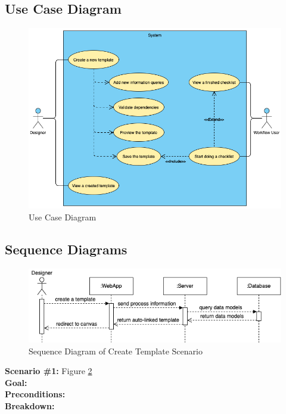 \subsection{Use Case Diagram}
\begin{figure}[ht!]
    \centering
    \includegraphics[width=\textwidth]{overleaf/images/use_case_diagram.png}
    \caption{Use Case Diagram}
    \label{fig:use_case_diagram}
\end{figure}

\subsection{Sequence Diagrams}
\begin{figure}[ht!]
    \centering
    \includegraphics[width=\textwidth]{overleaf/images/create_template.png}
    \caption{Sequence Diagram of Create Template Scenario}
    \label{fig:create_template}
\end{figure}

\noindent
\textbf{Scenario \#1:} Figure \ref{fig:create_template} \\
\textbf{Goal:} \\
\textbf{Preconditions:} \\
\textbf{Breakdown:} \\

